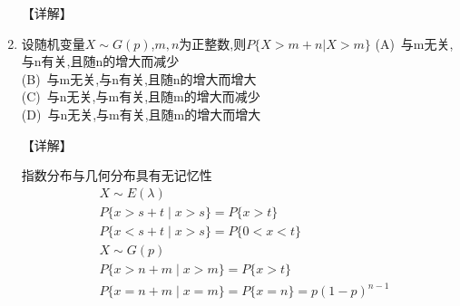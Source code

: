 \documentclass[12pt, a4paper, oneside, UTF8]{ctexbook}
\begin{document}
\begin{enumerate}[label=\arabic*.,start=6]
    \begin{solution}
    【详解】
    \end{solution}
    
    \item  设随机变量$X\sim G(p)$,$m,n$为正整数,则$P\{X>m+n|X>m\}$
    (A)\ 与m无关,与n有关,且随n的增大而减少 \\
    (B)\ 与m无关,与n有关,且随n的增大而增大 \\
    (C)\ 与n无关,与m有关,且随m的增大而减少 \\
    (D)\ 与n无关,与m有关,且随m的增大而增大

    \begin{solution}
    【详解】
    \end{solution}
    \begin{tcolorbox}[title=总结]
        指数分布与几何分布具有无记忆性
        \begin{align*}
            &X\sim E(\lambda) \\
            &P\{x>s+t\mid x>s\}=P\{x>t\} \\
            &P\{x<s+t\mid x>s\}=P\{0<x<t\} \\
            &X\sim G(p) \\
            &P\{x>n+m\mid x>m\}=P\{x>t\} \\
            &P\{x=n+m\mid x=m\}=P\{x=n\}=p(1-p)^{n-1} \\
        \end{align*}
    \end{tcolorbox}
\end{enumerate}
\end{document}

